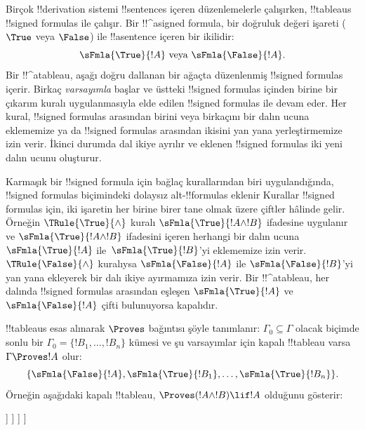 

      {}
      {}


Birçok !!{derivation} sistemi !!{sentence}s içeren düzenlemelerle çalışırken,
!!{tableau}s !!{signed formula}s ile çalışır. Bir !!^a{signed formula}, bir
doğruluk değeri işareti ($\True$ veya $\False$) ile !!a{sentence} içeren bir
ikilidir:
\[
\sFmla{\True}{!A} \text{ veya } \sFmla{\False}{!A}.
\]
Bir !!^a{tableau}, aşağı doğru dallanan bir ağaçta düzenlenmiş !!{signed formula}s
içerir. Birkaç \emph{varsayımla} başlar ve üstteki !!{signed formula}s
içinden birine bir çıkarım kuralı uygulanmasıyla elde edilen !!{signed
formula}s ile devam eder. Her kural, !!{signed formula}s arasından birini
veya birkaçını bir dalın ucuna eklememize ya da !!{signed formula}s arasından
ikisini yan yana yerleştirmemize izin verir. İkinci durumda dal ikiye ayrılır
ve eklenen !!{signed formula}s iki yeni dalın ucunu oluşturur.

Karmaşık bir !!{signed formula} için bağlaç kurallarından biri uygulandığında,
!!{signed formula}s biçimindeki dolaysız alt-!!{formula}s eklenir
Kurallar !!{signed formula}s
için, iki işaretin her birine birer tane olmak üzere çiftler hâlinde gelir. Örneğin
$\TRule{\True}{\land}$ kuralı $\sFmla{\True}{!A \land !B}$ ifadesine
uygulanır ve $\sFmla{\True}{!A \land !B}$ ifadesini içeren herhangi bir dalın ucuna
$\sFmla{\True}{!A}$ ile~$\sFmla{\True}{!B}$'yi eklememize izin
verir.
$\TRule{\False}{\land}$ kuralıysa $\sFmla{\False}{!A}$ ile
$\sFmla{\False}{!B}$'yi yan yana ekleyerek bir dalı ikiye ayırmamıza izin
verir. Bir !!^a{tableau}, her dalında !!{signed formula}s arasından eşleşen
$\sFmla{\True}{!A}$ ve $\sFmla{\False}{!A}$ çifti bulunuyorsa kapalıdır.

!!{tableau}s esas alınarak $\Proves$ bağıntısı şöyle tanımlanır:
$\Gamma_0 \subseteq \Gamma$ olacak biçimde sonlu bir
$\Gamma_0 = \{!B_1, \dots, !B_n\}$ kümesi ve şu varsayımlar için kapalı
!!{tableau} varsa $\Gamma
\Proves !A$ olur:
\[
\{\sFmla{\False}{!A}, \sFmla{\True}{!B_1}, \dots, \sFmla{\True}{!B_n}\}.
\]
Örneğin aşağıdaki kapalı !!{tableau}, $\Proves (!A \land !B) \lif !A$
olduğunu gösterir:
\begin{oltableau}
  [\sFmla{\False}{(\formula{A} \land \formula{B}) \lif \formula{A}}, just = \TAss
    [\sFmla{\True}{\formula{A} \land \formula{B}}, just = {\TRule{\False}{\lif}[1]}
      [\sFmla{\False}{\formula{A}}, just = {\TRule{\False}{\lif}[1]}
        [\sFmla{\True}{\formula{A}}, just = {\TRule{\True}{\land}[2]}
          [\sFmla{\True}{\formula{B}}, just = {\TRule{\True}{\land}[2]}, close]
        ]
      ]
    ]
  ]
\end{oltableau}

